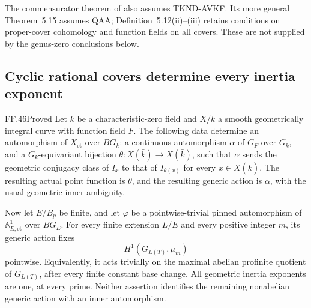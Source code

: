 The commensurator theorem of
\citet[Theorem~6.8]{FF_HoshiMochizukiTsujimura2025}
also assumes TKND-AVKF. Its more general
Theorem~5.15 assumes QAA; Definition~5.12(ii)--(iii)
retains conditions on proper-cover cohomology and
function fields on all covers. These are not supplied
by the genus-zero conclusions below.


\subsection{Cyclic rational covers determine every inertia exponent}

\begin{claim}{FF.46}{Proved}\label{clm:FFallprimekernel}
Let \(k\) be a characteristic-zero field and \(X/k\)
a smooth geometrically integral curve with function field
\(F\). The following data determine an automorphism of
\(X_{\mathrm{\acute et}}\) over \(BG_k\): a continuous
automorphism \(\alpha\) of \(G_F\) over \(G_k\),
and a \(G_k\)-equivariant bijection
\(\theta:X(\bar k)\to X(\bar k)\), such that
\(\alpha\) sends the geometric conjugacy class of
\(I_x\) to that of \(I_{\theta(x)}\) for every
\(x\in X(\bar k)\). The resulting actual point
function is \(\theta\), and the resulting generic
action is \(\alpha\), with the usual geometric inner
ambiguity.

Now let \(E/B_p\) be finite, and let \(\varphi\)
be a pointwise-trivial pinned automorphism of
\(\mathbb A^1_{E,\mathrm{\acute et}}\) over \(BG_E\).
For every finite extension \(L/E\) and every positive
integer \(m\), its generic action fixes
\[
                    H^1(G_{L(T)},\mu_m)
\]
pointwise. Equivalently, it acts trivially on the maximal
abelian profinite quotient of \(G_{L(T)}\), after
every finite constant base change. All geometric inertia
exponents are one, at every prime. Neither assertion
identifies the remaining nonabelian generic action with
an inner automorphism.
\end{claim}


